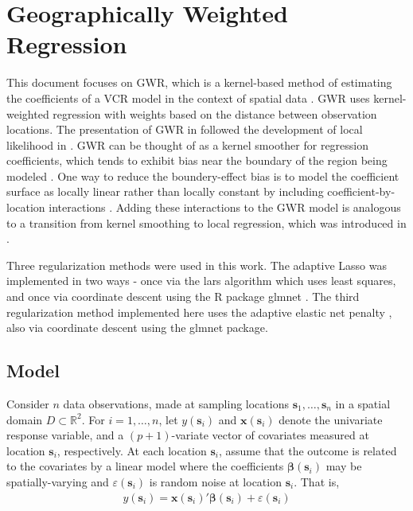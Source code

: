 \documentclass[authoryear, review, 11pt]{elsarticle}
\begin{document}
\section{Geographically Weighted Regression \label{section:GWR}}
	This document focuses on GWR, which is a kernel-based method of estimating the coefficients of a VCR model in the context of spatial data \citep{Brundson:1998a, Fotheringham:2002}. GWR uses kernel-weighted regression with weights based on the distance between observation locations. The presentation of GWR in \cite{Fotheringham:2002} followed the development of local likelihood in \cite{Loader:1999}. GWR can be thought of as a kernel smoother for regression coefficients, which tends to exhibit bias near the boundary of the region being modeled \citep{Hastie:1993b}. One way to reduce the boundery-effect bias is to model the coefficient surface as locally linear rather than locally constant by including coefficient-by-location interactions \citep{Hastie:1993b}. Adding these interactions to the GWR model is analogous to a transition from kernel smoothing to local regression, which was introduced in \cite{Wang:2008b}.
	
	Three regularization methods were used in this work. The adaptive Lasso was implemented in two ways - once via the lars algorithm \citep{Efron:2004b} which uses least squares, and once via coordinate descent using the R package glmnet \citep{Friedman:2010}. The third regularization method implemented here uses the adaptive elastic net penalty \citep{Zou:2009}, also via coordinate descent using the glmnet package.

	\subsection{Model}	
	Consider $n$ data observations, made at sampling locations $\bm{s}_1, \dots, \bm{s}_n$ in a spatial domain $D \subset \mathbb{R}^2$. For $i = 1, \dots, n$, let $y(\bm{s}_i)$ and $\bm{x}(\bm{s}_i)$ denote the univariate response variable, and a $(p+1)$-variate vector of covariates measured at location $\bm{s}_i$, respectively. At each location $\bm{s}_i$, assume that the outcome is related to the covariates by a linear model where the coefficients $\bm{\beta}(\bm{s}_i)$ may be spatially-varying and $\varepsilon(\bm{s}_i)$ is random noise at location $\bm{s}_i$. That is,
	\begin{align}\label{eq:lm(s)}
		y(\bm{s}_i) = \bm{x}(\bm{s}_i)' \bm{\beta}(\bm{s}_i) + \varepsilon(\bm{s}_i)
	\end{align}
	
\end{document}

